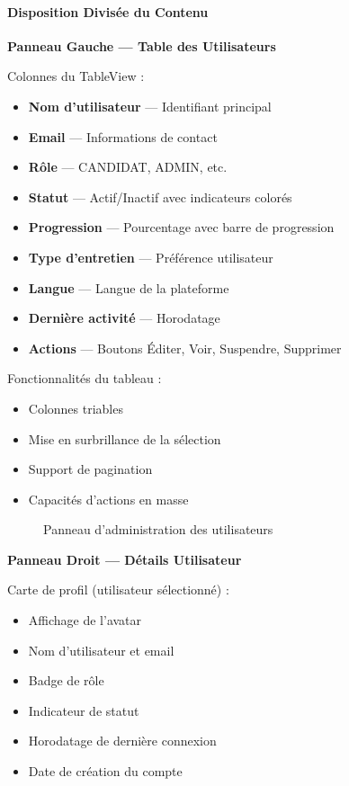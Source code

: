 \documentclass[12pt, a4paper]{report}
\begin{document}
\paragraph{Disposition Divisée du Contenu}

\textbf{Panneau Gauche --- Table des Utilisateurs}

Colonnes du TableView :
\begin{itemize}
    \item \textbf{Nom d'utilisateur} --- Identifiant principal
    \item \textbf{Email} --- Informations de contact
    \item \textbf{Rôle} --- CANDIDAT, ADMIN, etc.
    \item \textbf{Statut} --- Actif/Inactif avec indicateurs colorés
    \item \textbf{Progression} --- Pourcentage avec barre de progression
    \item \textbf{Type d'entretien} --- Préférence utilisateur
    \item \textbf{Langue} --- Langue de la plateforme
    \item \textbf{Dernière activité} --- Horodatage
    \item \textbf{Actions} --- Boutons Éditer, Voir, Suspendre, Supprimer
\end{itemize}

Fonctionnalités du tableau :
\begin{itemize}
    \item Colonnes triables
    \item Mise en surbrillance de la sélection
    \item Support de pagination
    \item Capacités d'actions en masse
\end{itemize}

\begin{figure}[H]
    \centering
    \caption{Panneau d'administration des utilisateurs}
    \label{fig:user-management}
\end{figure}

\textbf{Panneau Droit --- Détails Utilisateur}

Carte de profil (utilisateur sélectionné) :
\begin{itemize}
    \item Affichage de l'avatar
    \item Nom d'utilisateur et email
    \item Badge de rôle
    \item Indicateur de statut
    \item Horodatage de dernière connexion
    \item Date de création du compte
\end{itemize}
\end{document}
